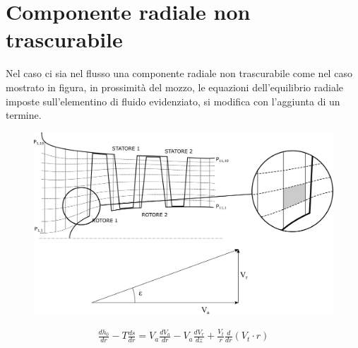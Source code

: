 \section{Componente radiale non trascurabile}
Nel caso ci sia nel flusso una componente radiale non trascurabile come nel caso mostrato in figura, in prossimità del mozzo, le equazioni dell'equilibrio radiale imposte sull'elementino di fluido evidenziato, si modifica con l'aggiunta di un termine. 
\begin{figure}
\centering
  \includegraphics[width=.8\textwidth]{fig/comp_rad.pdf}
\caption{}
\label{fd:comp_rad}
\end{figure}
\begin{align*}
\frac{d h_0}{dr} - T\frac{ds}{dr} = V_a \frac{dV_a}{dr} - \boxed{V_a \frac{dV_r}{dz}} + \frac{V_t}{r} \frac{d}{dr} ( V_t \cdot r)
\end{align*}

